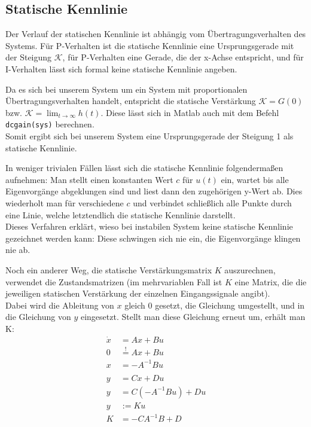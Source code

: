 

\subsection{Statische Kennlinie}
Der Verlauf der statischen Kennlinie ist abhängig vom Übertragungsverhalten des Systems. Für P-Verhalten ist die statische Kennlinie eine Ursprungsgerade mit der Steigung $\mathcal{K}$, für P-Verhalten eine Gerade, die der x-Achse entspricht, und für I-Verhalten lässt sich formal keine statische Kennlinie angeben.

Da es sich bei unserem System um ein System mit proportionalen Übertragungsverhalten handelt, entspricht die statische Verstärkung $\mathcal{K} = G(0)$ bzw. $\mathcal{K} = \lim_{t\to \infty} h(t)$. Diese lässt sich in Matlab auch mit dem Befehl \texttt{dcgain(sys)} berechnen. \\
Somit ergibt sich bei unserem System eine Ursprungsgerade der Steigung 1 als statische Kennlinie. 

In weniger trivialen Fällen lässt sich die statische Kennlinie folgendermaßen aufnehmen: Man stellt einen konstanten Wert $c$ für $u(t)$ ein, wartet bis alle Eigenvorgänge abgeklungen sind und liest dann den zugehörigen y-Wert ab. Dies wiederholt man für verschiedene $c$ und verbindet schließlich alle Punkte durch eine Linie, welche letztendlich die statische Kennlinie darstellt. \\
Dieses Verfahren erklärt, wieso bei instabilen System keine statische Kennlinie gezeichnet werden kann: Diese schwingen sich nie ein, die Eigenvorgänge klingen nie ab.

Noch ein anderer Weg, die statische Verstärkungsmatrix $K$ auszurechnen, verwendet die Zustandsmatrizen (im mehrvariablen Fall ist $K$ eine Matrix, die die jeweiligen statischen Verstärkung der einzelnen Eingangssignale angibt). \\
Dabei wird die Ableitung von $x$ gleich 0 gesetzt, die Gleichung umgestellt, und in die Gleichung von $y$ eingesetzt. Stellt man diese Gleichung erneut um, erhält man K:
\begin{align*}
\dot x &= Ax + Bu \\
0 &\stackrel{!}{=} Ax + Bu \\
x &= -A^{-1}Bu\\ \\
y &= Cx + Du \\
y &= C(-A^{-1}Bu) + Du \\
y &:= Ku \\
K &= -CA^{-1}B + D
\end{align*}

